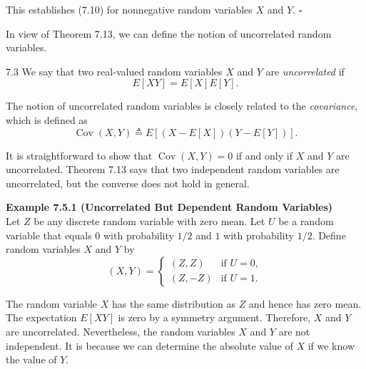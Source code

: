 This establishes (7.10) for nonnegative random variables $X$ and $Y$. \hfill $\square$

In view of Theorem 7.13, we can define the notion of uncorrelated random variables.

\begin{defbox}{7.3}
We say that two real-valued random variables $X$ and $Y$ are \textit{uncorrelated} if
\[
E[XY]=E[X]E[Y].
\]

The notion of uncorrelated random variables is closely related to the \textit{covariance}, which is defined as
\[
\operatorname{Cov}(X,Y)\triangleq E[(X-E[X])(Y-E[Y])].
\]

It is straightforward to show that $\operatorname{Cov}(X,Y)=0$ if and only if $X$ and $Y$ are uncorrelated. Theorem 7.13 says that two independent random variables are uncorrelated, but the converse does not hold in general.
\end{defbox}

\textbf{Example 7.5.1 (Uncorrelated But Dependent Random Variables)} \\
Let $Z$ be any discrete random variable with zero mean. Let $U$ be a random variable that equals $0$ with probability $1/2$ and $1$ with probability $1/2$. Define random variables $X$ and $Y$ by
\[
(X,Y)=
\begin{cases}
(Z,Z) & \text{if } U=0,\\
(Z,-Z) & \text{if } U=1.
\end{cases}
\]

The random variable $X$ has the same distribution as $Z$ and hence has zero mean. The expectation $E[XY]$ is zero by a symmetry argument. Therefore, $X$ and $Y$ are uncorrelated. Nevertheless, the random variables $X$ and $Y$ are not independent. It is because we can determine the absolute value of $X$ if we know the value of $Y$.
